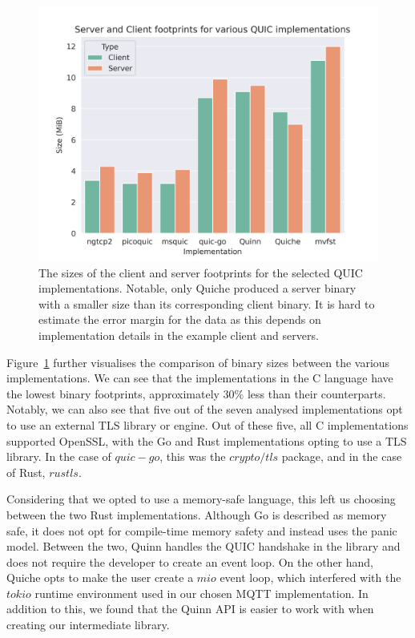 \begin{figure}[ht]
    \centering
    \includegraphics[width=1\linewidth]{images/quic_impls.png}
    \caption{The sizes of the client and server footprints for the selected QUIC implementations. Notable, only Quiche produced a server binary with a smaller size than its corresponding client binary. It is hard to estimate the error margin for the data as this depends on implementation details in the example client and servers.}
    \label{fig:quic_impls}
\end{figure}

Figure~\ref{fig:quic_impls} further visualises the comparison of binary sizes between the various implementations.
We can see that the implementations in the C language have the lowest binary footprints, approximately 30\% less than their counterparts.
Notably, we can also see that five out of the seven analysed implementations opt to use an external TLS library or engine.
Out of these five, all C implementations supported OpenSSL, with the Go and Rust implementations opting to use a TLS library.
In the case of $quic-go$, this was the $crypto/tls$ package, and in the case of Rust, $rustls$.

Considering that we opted to use a memory-safe language, this left us choosing between the two Rust implementations. Although Go is described as memory safe, it does not opt for compile-time memory safety and instead uses the panic model.
Between the two, Quinn handles the QUIC handshake in the library and does not require the developer to create an event loop.
On the other hand, Quiche opts to make the user create a $mio$ event loop, which interfered with the $tokio$ runtime environment used in our chosen MQTT implementation.
In addition to this, we found that the Quinn API is easier to work with when creating our intermediate library.